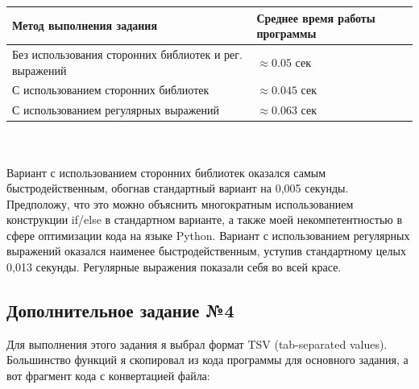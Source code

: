 \documentclass[12pt]{article}
\begin{document}
\begin{tabular}{|p{12cm}|p{5cm}|}
    \hline
    \centering
    \textbf{Метод выполнения задания} & \textbf{Среднее время работы программы}\\
    \hline
    Без использования сторонних библиотек и рег. выражений & $\approx 0.05$ сек\\
    \hline
    С использованием сторонних библиотек & $\approx 0.045$ сек\\
    \hline
    С использованием регулярных выражений & $\approx 0.063$ сек\\
    \hline
\end{tabular}
\\
\\
Вариант с использованием сторонних библиотек оказался самым быстродейственным, обогнав стандартный вариант на 0,005 секунды. Предположу, что это можно объяснить многократным использованием конструкции if/else в стандартном варианте, а также моей некомпетентностью в сфере оптимизации кода на языке Python. Вариант с использованием регулярных выражений оказался наименее быстродейственным, уступив стандартному целых 0,013 секунды. Регулярные выражения показали себя во всей красе.\\

\subsection{Дополнительное задание №4}

Для выполнения этого задания я выбрал формат TSV (tab-separated values). Большинство функций я скопировал из кода программы для основного задания, а вот фрагмент кода с конвертацией файла:
\end{document}
